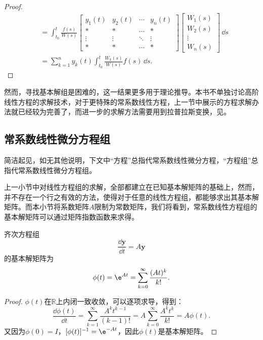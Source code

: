 \begin{proof}
\begin{align}
        &=\int_{t_0}^t \frac{f(s)}{W(s)}\begin{bmatrix}
        y_1(t) & y_2(t) & \cdots & y_n(t)\\
        * & * & \cdots & *\\
        \vdots & \vdots & \ddots & \vdots\\
        * & * & \cdots & *
        \end{bmatrix}\begin{bmatrix}
        W_1(s)\\
        W_2(s)\\
        \vdots\\
        W_n(s)
        \end{bmatrix}\,\dd s\nonumber\\
        &=\sum_{k=1}^n y_k(t)\int_{t_0}^t \frac{W_k(s)}{W(s)}f(s)\,\dd s.
    \end{align}
\end{proof}

然而，寻找基本解组是困难的，这一结果更多用于理论推导。本书不单独讨论高阶线性方程的求解技术，对于更特殊的常系数线性方程，上一节中展示的方程求解办法就已经较为完善了，而进一步的求解方法需要用到拉普拉斯变换，见。%

\subsection{常系数线性微分方程组}\label{sub:constant_coefficient_linear_equation_system}

简洁起见，如无其他说明，下文中“方程”总指代常系数线性微分方程，“方程组”总指代常系数线性微分方程组。

上一小节中对线性方程组的求解，全部都建立在已知基本解矩阵的基础上，然而，并不存在一个行之有效的方法，使得对于任意的线性方程组，都能够求出其基本解矩阵。而本小节将系数矩阵$A$限制为常数矩阵，我们将看到，常系数线性方程组的基本解矩阵可以通过矩阵指数函数来求得。

\begin{theorem}
    齐次方程组
    \begin{equation}
        \frac{\dd\mathbf{y}}{\dd t}=A\mathbf{y}
    \end{equation}
    的基本解矩阵为
    \begin{equation}
        \phi(t)=\e^{At}=\sum_{k=0}^{\infty}\frac{(At)^k}{k!}.
    \end{equation}
\end{theorem}
\begin{proof}
    $\phi(t)$在$\mathbb{R}$上内闭一致收敛，可以逐项求导，得到：
    \begin{equation}
        \frac{\dd\phi(t)}{\dd t}=\sum_{k=1}^{\infty}\frac{A^k t^{k-1}}{(k-1)!}=A\sum_{k=0}^{\infty}\frac{A^k t^k}{k!}=A\phi(t).
    \end{equation}
    又因为$\phi(0)=I$，$[\phi(t)]^{-1}=\e^{-At}$，因此$\phi(t)$是基本解矩阵。
\end{proof}

